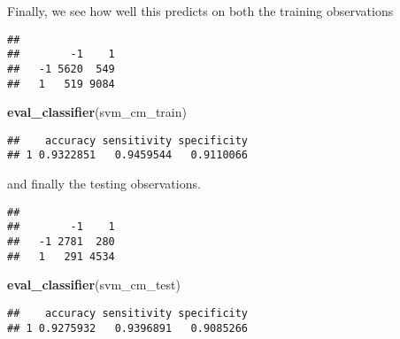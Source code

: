 \documentclass[]{book}
\newenvironment{Shaded}{\begin{snugshade}}{\end{snugshade}}
\newcommand{\DataTypeTok}[1]{\textcolor[rgb]{0.13,0.29,0.53}{#1}}
\newcommand{\KeywordTok}[1]{\textcolor[rgb]{0.13,0.29,0.53}{\textbf{#1}}}
\newcommand{\NormalTok}[1]{#1}
\newcommand{\OperatorTok}[1]{\textcolor[rgb]{0.81,0.36,0.00}{\textbf{#1}}}
\newcommand{\StringTok}[1]{\textcolor[rgb]{0.31,0.60,0.02}{#1}}
\begin{document}
Finally, we see how well this predicts on both the training observations

\begin{Shaded}
\end{Shaded}

\begin{verbatim}
##     
##        -1    1
##   -1 5620  549
##   1   519 9084
\end{verbatim}

\begin{Shaded}
\begin{Highlighting}[]
\KeywordTok{eval_classifier}\NormalTok{(svm_cm_train)}
\end{Highlighting}
\end{Shaded}

\begin{verbatim}
##    accuracy sensitivity specificity
## 1 0.9322851   0.9459544   0.9110066
\end{verbatim}

and finally the testing observations.

\begin{Shaded}
\end{Shaded}

\begin{verbatim}
##     
##        -1    1
##   -1 2781  280
##   1   291 4534
\end{verbatim}

\begin{Shaded}
\begin{Highlighting}[]
\KeywordTok{eval_classifier}\NormalTok{(svm_cm_test)}
\end{Highlighting}
\end{Shaded}

\begin{verbatim}
##    accuracy sensitivity specificity
## 1 0.9275932   0.9396891   0.9085266
\end{verbatim}
\end{document}
